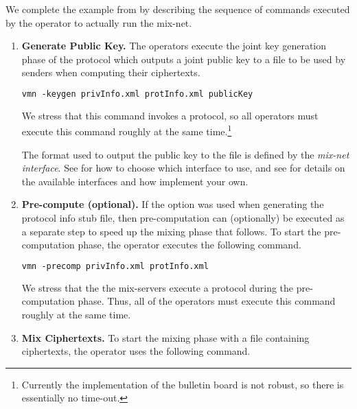 \documentclass[11pt]{article}
\begin{document}
We complete the example from  by describing the sequence
of commands executed by the operator to actually run the mix-net.
\begin{enumerate}

\item\textbf{Generate Public Key.} The operators execute the joint key
  generation phase of the protocol which outputs a joint public key to
  a file  to be used by senders when computing their
  ciphertexts.
  
\vspace{0.3cm}
\begin{lstlisting}[frame=single,language=xml,
basicstyle=\tt,showstringspaces=false]
vmn -keygen privInfo.xml protInfo.xml publicKey
\end{lstlisting}

We stress that this command invokes a protocol, so all operators must
execute this command roughly at the same time.\footnote{Currently the
  implementation of the bulletin board is not robust, so there is essentially no time-out.}

  The format used to output the public key to the file
   is defined by the \emph{mix-net interface}. See
   for how to choose which interface to use, and see
   for details on the available interfaces and how
  implement your own.

\item\label{step:precomp}\textbf{Pre-compute (optional).} If the
   option was used when generating the protocol info
  stub file, then pre-computation can (optionally) be executed as a
  separate step to speed up the mixing phase that follows. To start
  the pre-computation phase, the operator executes the following
  command.

\vspace{0.3cm}
\begin{lstlisting}[frame=single,language=xml,
basicstyle=\tt,showstringspaces=false]
vmn -precomp privInfo.xml protInfo.xml
\end{lstlisting}

  We stress that the the mix-servers execute a protocol during the
  pre-computation phase. Thus, all of the operators must execute this
  command roughly at the same time.

\item\textbf{Mix Ciphertexts.}  To start the mixing phase with a file
   containing ciphertexts, the operator uses the
  following command.


\end{enumerate}
\end{document}
